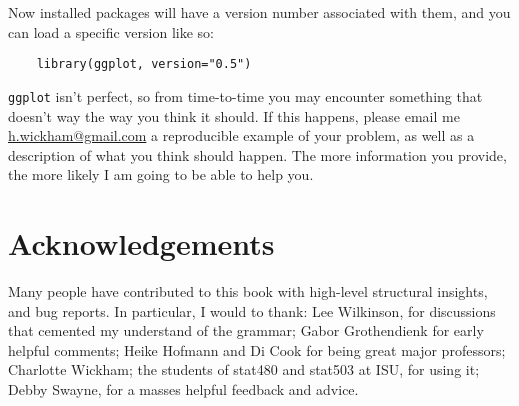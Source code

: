 Now installed packages will have a version number associated with them, and you can load a specific version like so:

\begin{verbatim}
	library(ggplot, version="0.5")
\end{verbatim}

{\tt ggplot} isn't perfect, so from time-to-time you may encounter something that doesn't way the way you think it should.  If this happens, please email me \href{mailto:h.wickham@gmail.com}{h.wickham@gmail.com} a reproducible example of your problem, as well as a description of what you think should happen.  The more information you provide, the more likely I am going to be able to help you.

\section{Acknowledgements}\label{sec:acknolwedgements}

Many people have contributed to this book with high-level structural insights, and bug reports.  In particular, I would to thank: Lee Wilkinson, for discussions that cemented my understand of the grammar; Gabor Grothendienk for early helpful comments; Heike Hofmann and Di Cook for being great major professors; Charlotte Wickham; the students of stat480 and stat503 at ISU, for using it; Debby Swayne, for a masses helpful feedback and advice.


